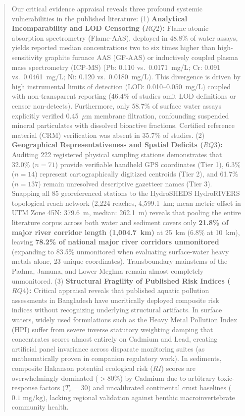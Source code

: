 \documentclass[authoryear,preprint,12pt]{elsarticle}
\begin{document}
\begin{frontmatter}
\begin{abstract}
Our critical evidence appraisal reveals three profound systemic vulnerabilities in the published literature:
(1) \textbf{Analytical Incomparability and LOD Censoring ($RQ2$):} Flame atomic absorption spectrometry (Flame-AAS), deployed in 48.8\% of water assays, yields reported median concentrations two to six times higher than high-sensitivity graphite furnace AAS (GF-AAS) or inductively coupled plasma mass spectrometry (ICP-MS) (Pb: 0.110 vs.\ 0.0171~mg/L; Cr: 0.091 vs.\ 0.0461~mg/L; Ni: 0.120 vs.\ 0.0180~mg/L). This divergence is driven by high instrumental limits of detection (LOD: 0.010--0.050~mg/L) coupled with non-transparent reporting (46.4\% of studies omit LOD definitions or censor non-detects). Furthermore, only 58.7\% of surface water assays explicitly verified 0.45~$\mu\text{m}$ membrane filtration, confounding suspended mineral particulates with dissolved bioactive fractions. Certified reference material (CRM) verification was absent in 35.7\% of studies.
(2) \textbf{Geographical Representativeness and Spatial Deficits ($RQ3$):} Auditing 222 registered physical sampling stations demonstrates that 32.0\% ($n=71$) provide verifiable handheld GPS coordinates (Tier 1), 6.3\% ($n=14$) represent cartographically digitized centroids (Tier 2), and 61.7\% ($n=137$) remain unresolved descriptive gazetteer names (Tier 3). Snapping all 85 georeferenced stations to the HydroSHEDS HydroRIVERS topological reach network (2,224 reaches, 4,599.1~km; mean metric offset in UTM Zone 45N: 379.6~m, median: 262.1~m) reveals that pooling the entire literature corpus across both water and sediment covers only \textbf{21.8\% of major river corridor length (1,004.7~km)} at 25~km (6.8\% at 10~km), leaving \textbf{78.2\% of national major river corridors unmonitored} (expanding to 83.5\% unmonitored when evaluating surface-water heavy metals alone, 23 unique coordinates). Transboundary mainstems of the Padma, Jamuna, and Lower Meghna remain almost completely unmonitored.
(3) \textbf{Structural Fragility of Published Risk Indices ($RQ4$):} Critical appraisal reveals that published aquatic pollution assessments in Bangladesh have uncritically deployed composite risk indices without recognizing underlying structural artifacts. In surface waters, widely used formulations such as the Heavy Metal Pollution Index ($\mathrm{HPI}$) suffer from severe inverse statutory weighting damping that concentrates scores almost entirely on Cadmium and Lead, creating artificial panel invariance across disparate monitoring suites (as mathematically proven in companion regulatory work). In sediments, composite Hakanson potential ecological risk ($RI$) scores are overwhelmingly dominated ($>80\%$) by Cadmium due to arbitrary toxic-response factors ($T_r=30$) and uncalibrated continental crust baselines ($0.1\text{ mg/kg}$), lacking regional validation against benthic macroinvertebrate community health.


\end{abstract}
\end{frontmatter}
\end{document}
